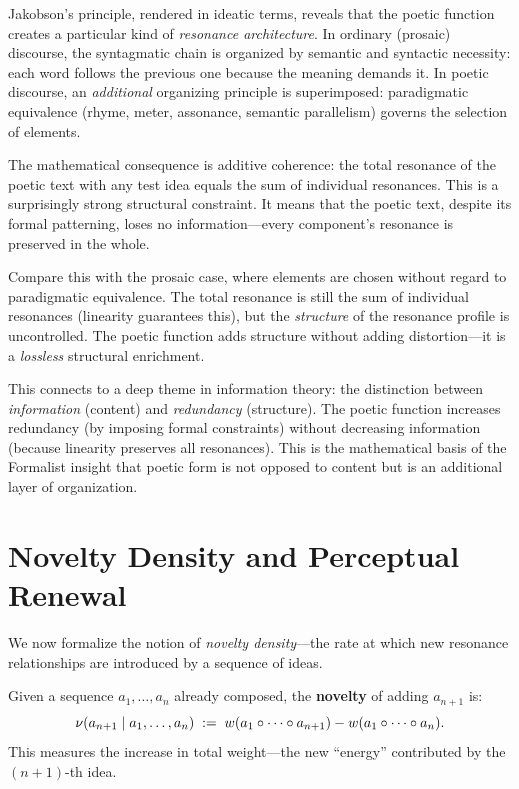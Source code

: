 \begin{interpretation}
\label{interp:jakobson}
Jakobson's principle, rendered in ideatic terms, reveals that the poetic function
creates a particular kind of \emph{resonance architecture}.  In ordinary
(prosaic) discourse, the syntagmatic chain is organized by semantic and syntactic
necessity: each word follows the previous one because the meaning demands it.
In poetic discourse, an \emph{additional} organizing principle is superimposed:
paradigmatic equivalence (rhyme, meter, assonance, semantic parallelism) governs
the selection of elements.

The mathematical consequence is additive coherence: the total resonance of the
poetic text with any test idea equals the sum of individual resonances.  This
is a surprisingly strong structural constraint.  It means that the poetic text,
despite its formal patterning, loses no information---every component's
resonance is preserved in the whole.

Compare this with the prosaic case, where elements are chosen without regard to
paradigmatic equivalence.  The total resonance is still the sum of individual
resonances (linearity guarantees this), but the \emph{structure} of the
resonance profile is uncontrolled.  The poetic function adds structure without
adding distortion---it is a \emph{lossless} structural enrichment.

This connects to a deep theme in information theory: the distinction between
\emph{information} (content) and \emph{redundancy} (structure).  The poetic
function increases redundancy (by imposing formal constraints) without
decreasing information (because linearity preserves all resonances).  This
is the mathematical basis of the Formalist insight that poetic form is not
opposed to content but is an additional layer of organization.
\end{interpretation}

\section{Novelty Density and Perceptual Renewal}

We now formalize the notion of \emph{novelty density}---the rate at which
new resonance relationships are introduced by a sequence of ideas.

\begin{definition}
\label{def:novelty}
Given a sequence $a_1, \ldots, a_n$ already composed, the \textbf{novelty}
of adding $a_{n+1}$ is:
\[
  \nu(a_{n+1} \mid a_1, \ldots, a_n)
  \;:=\; w(a_1 \circ \cdots \circ a_{n+1})
  - w(a_1 \circ \cdots \circ a_n).
\]
This measures the increase in total weight---the new ``energy'' contributed
by the $(n+1)$-th idea.
\end{definition}


